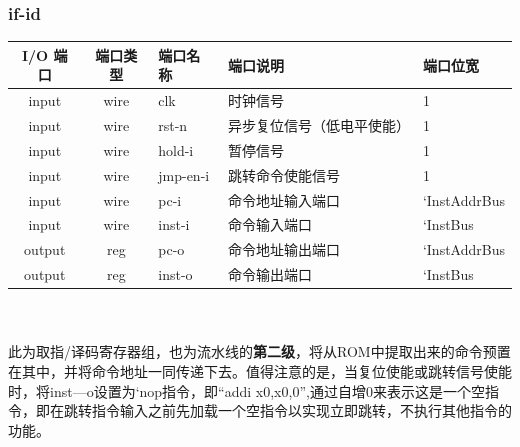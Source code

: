 \documentclass[lang=cn,11pt,a4paper]{elegantpaper}
\begin{document}
\subsubsection{if-id}
 \begin{tabular}{cclll}
	\toprule
	I/O 端口 & 端口类型 &端口名称&端口说明 &端口位宽\\
	\midrule
	input &wire& clk & 时钟信号 & 1 \\
	input &wire& rst-n & 异步复位信号（低电平使能） & 1 \\
	input &wire& hold-i & 暂停信号       & 1   \\
	input &wire& jmp-en-i & 跳转命令使能信号 & 1 \\
	input &wire&pc-i & 命令地址输入端口 & `InstAddrBus  \\
	input &wire&inst-i & 命令输入端口 & `InstBus  \\
	output &reg& pc-o & 命令地址输出端口    & `InstAddrBus   \\
	output &reg& inst-o & 命令输出端口    & `InstBus   \\
	\bottomrule
\end{tabular}\\
\\
此为取指/译码寄存器组，也为流水线的\textbf{第二级}，将从ROM中提取出来的命令预置在其中，并将命令地址一同传递下去。值得注意的是，当复位使能或跳转信号使能时，将inst—o设置为`nop指令，即“addi x0,x0,0”,通过自增0来表示这是一个空指令，即在跳转指令输入之前先加载一个空指令以实现立即跳转，不执行其他指令的功能。
\end{document}
